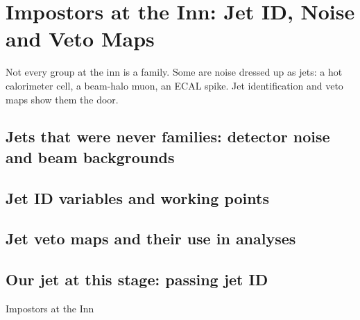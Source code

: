 \chapter{Impostors at the Inn: Jet ID, Noise and Veto Maps}
\label{ch:impostors}

\begin{journeybox}
Not every group at the inn is a family. Some are noise dressed up as jets: a hot
calorimeter cell, a beam-halo muon, an ECAL spike. Jet identification and veto
maps show them the door.
\end{journeybox}


\section{Jets that were never families: detector noise and beam backgrounds}
\label{sec:impostors:jets_that_were_never_families_detector_n}

\section{Jet ID variables and working points}
\label{sec:impostors:jet_id_variables_and_working_points}

\section{Jet veto maps and their use in analyses}
\label{sec:impostors:jet_veto_maps_and_their_use_in_analyses}

\section{Our jet at this stage: passing jet ID}
\label{sec:impostors:our_jet_at_this_stage_passing_jet_id}

\begin{ledger}{Impostors at the Inn}
\end{ledger}

